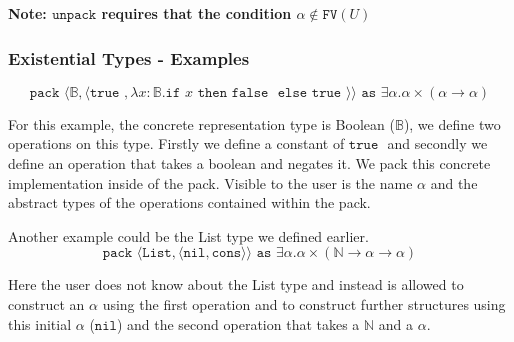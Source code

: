\documentclass{article}
\newcommand{\B}{\mathbb{B}}
\newcommand{\N}{\mathbb{N}}
\newcommand{\T}{\texttt{true }}
\newcommand{\F}{\texttt{false }}
\newcommand{\rarr}{\rightarrow}
\begin{document}
\textbf{Note: $ \texttt{unpack}$ requires that the condition $ \alpha \notin \texttt{FV}(U)$} 

\subsubsection{Existential Types - Examples}

$$
\texttt{pack } \langle \B, \langle \T, \lambda x: \B. \texttt{if } x \texttt{ then }  \F \texttt{ else } \T   \rangle  \rangle  \texttt{ as } \exists \alpha . \alpha \times ( \alpha \rarr \alpha )
$$

For this example, the concrete representation type is Boolean ($\B$), we define two operations on this type. Firstly we define a constant of $\T$ and secondly we define an operation that takes a boolean and negates it. We pack this concrete implementation inside of the pack. Visible to the user is the name $ \alpha $ and the abstract types of the operations contained within the pack.

Another example could be the List type we defined earlier.
$$
\texttt{pack } \langle \texttt{List}, \langle \texttt{nil}, \texttt{cons} \rangle  \rangle \texttt{ as } \exists \alpha . \alpha \times (\N \rarr \alpha \rarr \alpha )
$$

Here the user does not know about the List type and instead is allowed to construct an $ \alpha $ using the first operation and to construct further structures using this initial $ \alpha $ ($ \texttt{nil}$) and the second operation that takes a $\N$ and a $ \alpha $.
\end{document}
